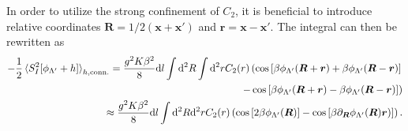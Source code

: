 \documentclass{svmono}
\def\rd{\mathrm d}
\newcommand{\commutator}[1]{\left[ #1 \right]}
\providecommand{\DIFaddbegin}{} %
\providecommand{\DIFaddend}{} %
\newcommand{\DIFaddincludegraphics}[2][]{{\color{blue}\fbox{\DIFOincludegraphics[#1]{#2}}}} %
\DeclareRobustCommand{\DIFaddbegin}{\DIFOaddbegin \let\includegraphics\DIFaddincludegraphics} %
\DeclareRobustCommand{\DIFaddend}{\DIFOaddend \let\includegraphics\DIFOincludegraphics} %
\begin{document}
In order to utilize the strong confinement of $C_2$, it is beneficial to introduce relative coordinates ${\bm R} = 1/2({\bm x}+{\bm x'})$ and ${\bm r} = {\bm x}-{\bm x'}$.
The integral can then be rewritten as
\DIFaddbegin {\small
\DIFaddend \begin{align}
    -\frac12\braket{S^2_I[\phi_{\Lambda'}+h]}_{h,{\rm conn.}}
    =
    \frac{g^2K\beta^2}8\rd l\int\rd^2R\int\rd^2r
    C_2(r)
    \left(
        \cos\commutator{\beta\phi_{\Lambda'}({\bm R}+{\bm r})+\beta\phi_{\Lambda'}({\bm R}-{\bm r})}
        \right.
        \label{eq:rg_int_1}\\
        \left.-
        \cos\commutator{\beta\phi_{\Lambda'}({\bm R}+{\bm r})-\beta\phi_{\Lambda'}({\bm R}-{\bm r})}
    \right)
    \label{eq:rg_int_2}
    \\
    \approx
    \frac{g^2K\beta^2}{8}\rd l\int\rd^2R\rd^2rC_2(r)
    \left(
        \cos\commutator{2\beta\phi_{\Lambda'}({\bm R})}
        -
        \cos\commutator{\beta\partial_{\bm R}\phi_{\Lambda'}({\bm R}){\bm r})}
    \right).
    \label{eq:rg_int_rel_coords}
\end{align}
\DIFaddbegin }
\DIFaddend 
\end{document}
